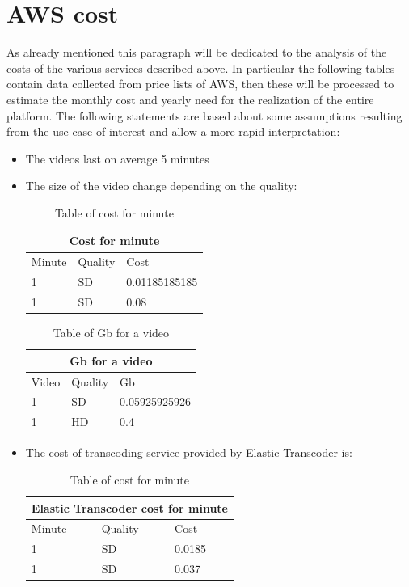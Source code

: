 \section{AWS cost}
\label{sec:AWS cost}
As already mentioned this paragraph will be dedicated to the analysis of the costs of the various services described above.
In particular the following tables contain data collected from price lists of AWS, then these will be processed to estimate the monthly cost and yearly need for the realization of the entire platform.
The following statements are based about some assumptions resulting from the use case of interest and allow a more rapid interpretation:

\begin{itemize}
\item The videos last on average 5 minutes
\item The size of the video change depending on the quality:

\begin{table}[h!]
\centering
\begin{tabular}{ |p{3cm}|p{3cm}|p{3cm}|  }
  \hline
  \multicolumn{3}{|c|}{Cost for minute} \\
  \hline
  Minute & Quality & Cost \\
  \hline
  1 & SD & 0.01185185185 \\
  1 & SD & 0.08 \\
  \hline
\end{tabular}
\caption{Table of cost for minute}
\label{table:1}
\end{table}

\begin{table}[h!]
\centering
\begin{tabular}{ |p{3cm}|p{3cm}|p{3cm}|  }
  \hline
  \multicolumn{3}{|c|}{Gb for a video} \\
  \hline
  Video & Quality & Gb \\
  \hline
  1 & SD & 0.05925925926 \\
  1 & HD & 0.4 \\
  \hline
\end{tabular}
\caption{Table of Gb for a video}
\label{table:1}
\end{table}


\item The cost of transcoding service provided by Elastic Transcoder is:

\begin{table}[h!]
\centering
\begin{tabular}{ |p{3cm}|p{3cm}|p{3cm}|  }
  \hline
  \multicolumn{3}{|c|}{Elastic Transcoder cost for minute} \\
  \hline
  Minute & Quality & Cost \\
  \hline
  1 & SD & 0.0185 \\
  1 & SD & 0.037 \\
  \hline
\end{tabular}
\caption{Table of cost for minute}
\label{table:1}
\end{table}


\end{itemize}
